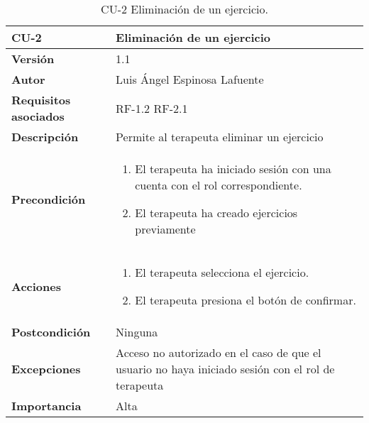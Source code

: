 \begin{table}[p]
	\centering
	\begin{tabularx}{\linewidth}{ p{} p{} }
		\toprule
		\textbf{CU-2}    & \textbf{Eliminación de un ejercicio}\\
		\toprule
		\textbf{Versión}              & 1.1    \\
		\textbf{Autor}                & Luis Ángel Espinosa Lafuente\\
		\textbf{Requisitos asociados} & RF-1.2 RF-2.1 \\
		\textbf{Descripción}          & Permite al terapeuta eliminar un ejercicio   \\
		\textbf{Precondición}         & 
		\begin{enumerate}		
			\def\labelenumi{\arabic{enumi}.}
			\tightlist
				\item El terapeuta ha iniciado sesión con una cuenta con el rol correspondiente.
				\item El terapeuta ha creado ejercicios previamente 
		\end{enumerate} \\
		\textbf{Acciones}             &
		\begin{enumerate}
			\def\labelenumi{\arabic{enumi}.}
			\tightlist
			\item El terapeuta selecciona el ejercicio.
			\item El terapeuta presiona el botón de confirmar.
		\end{enumerate}\\
		\textbf{Postcondición}        & Ninguna \\
		\textbf{Excepciones}          & Acceso no autorizado en el caso de que el usuario no haya iniciado sesión con el rol de terapeuta \\
		\textbf{Importancia}          & Alta \\
		\bottomrule
	\end{tabularx}
	\caption{CU-2 Eliminación de un ejercicio.}
\end{table}

